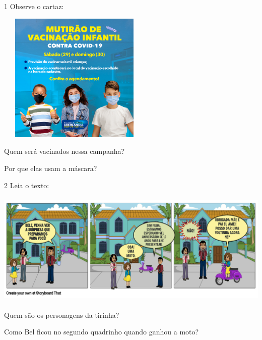 
\num{1} Observe o cartaz:

\includegraphics[width=2.89864in,height=2.45070in]{media/image128.png}


\begin{escolha}
\item Quem será vacinados nessa campanha?


\item Por que elas usam a máscara?

\end{escolha}

\num{2} Leia o texto:


\includegraphics[width=5.56806in,height=2.13216in]{media/image129.png}

\begin{escolha}
\item Quem são os personagens da tirinha?


\item Como Bel ficou no segundo quadrinho quando ganhou a moto?

\end{escolha}

